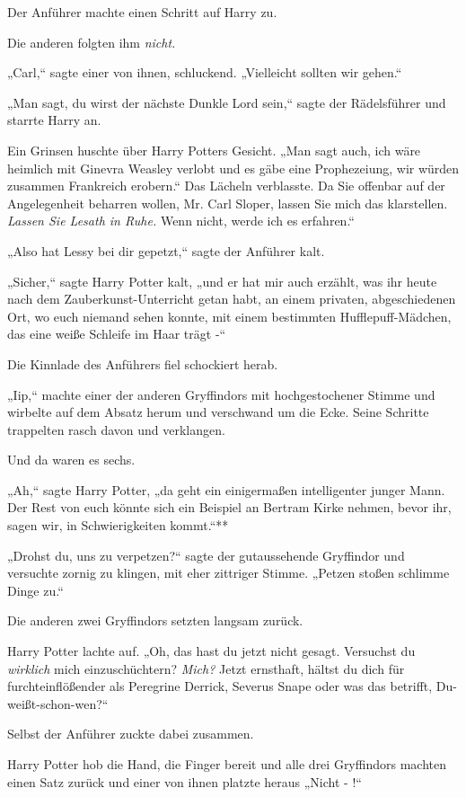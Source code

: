 {Der Anführer machte einen Schritt auf Harry zu.

Die anderen folgten ihm \emph{nicht.}

„Carl,“ sagte einer von ihnen, schluckend. „Vielleicht sollten wir gehen.“

„Man sagt, du wirst der nächste Dunkle Lord sein,“ sagte der Rädelsführer und starrte Harry an.

Ein Grinsen huschte über Harry Potters Gesicht. „Man sagt auch, ich wäre heimlich mit Ginevra Weasley verlobt und es gäbe eine Prophezeiung, wir würden zusammen Frankreich erobern.“ Das Lächeln verblasste. Da Sie offenbar auf der Angelegenheit beharren wollen, Mr. Carl Sloper, lassen Sie mich das klarstellen. \emph{Lassen Sie Lesath in Ruhe.} Wenn nicht, werde ich es erfahren.“

„Also hat Lessy bei dir gepetzt,“ sagte der Anführer kalt.

„Sicher,“ sagte Harry Potter kalt, „und er hat mir auch erzählt, was ihr heute nach dem Zauberkunst-Unterricht getan habt, an einem privaten, abgeschiedenen Ort, wo euch niemand sehen konnte, mit einem bestimmten Hufflepuff-Mädchen, das eine weiße Schleife im Haar trägt -“

Die Kinnlade des Anführers fiel schockiert herab.

„Iip,“ machte einer der anderen Gryffindors mit hochgestochener Stimme und wirbelte auf dem Absatz herum und verschwand um die Ecke. Seine Schritte trappelten rasch davon und verklangen.

Und da waren es sechs.

„Ah,“ sagte Harry Potter, „da geht ein einigermaßen intelligenter junger Mann. Der Rest von euch könnte sich ein Beispiel an Bertram Kirke nehmen, bevor ihr, sagen wir, in Schwierigkeiten kommt.“**

„Drohst du, uns zu verpetzen?“ sagte der gutaussehende Gryffindor und versuchte zornig zu klingen, mit eher zittriger Stimme. „Petzen stoßen schlimme Dinge zu.“

Die anderen zwei Gryffindors setzten langsam zurück.

Harry Potter lachte auf. „Oh, das hast du jetzt nicht gesagt. Versuchst du \emph{wirklich} mich einzuschüchtern? \emph{Mich?} Jetzt ernsthaft, hältst du dich für furchteinflößender als Peregrine Derrick, Severus Snape oder was das betrifft, Du-weißt-schon-wen?“

Selbst der Anführer zuckte dabei zusammen.

Harry Potter hob die Hand, die Finger bereit und alle drei Gryffindors machten einen Satz zurück und einer von ihnen platzte heraus „Nicht - !“

}
